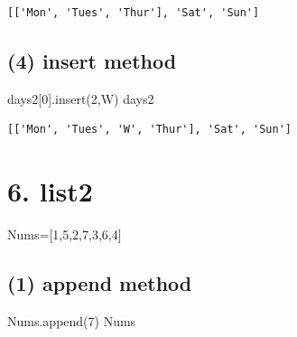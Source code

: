 \documentclass[
  a4paper,
  DIV=11,
  numbers=noendperiod]{scrreprt}
\newenvironment{Shaded}{\begin{snugshade}}{\end{snugshade}}
\newcommand{\DecValTok}[1]{\textcolor[rgb]{0.68,0.00,0.00}{#1}}
\newcommand{\NormalTok}[1]{\textcolor[rgb]{0.00,0.23,0.31}{#1}}
\newcommand{\OperatorTok}[1]{\textcolor[rgb]{0.37,0.37,0.37}{#1}}
\newcommand{\StringTok}[1]{\textcolor[rgb]{0.13,0.47,0.30}{#1}}
\begin{document}
\begin{verbatim}
[['Mon', 'Tues', 'Thur'], 'Sat', 'Sun']
\end{verbatim}

\subsection*{(4) insert method}\label{insert-method}

\begin{Shaded}
\begin{Highlighting}[]
\NormalTok{days2[}\DecValTok{0}\NormalTok{].insert(}\DecValTok{2}\NormalTok{,}\StringTok{\textquotesingle{}W\textquotesingle{}}\NormalTok{)}
\NormalTok{days2}
\end{Highlighting}
\end{Shaded}

\begin{verbatim}
[['Mon', 'Tues', 'W', 'Thur'], 'Sat', 'Sun']
\end{verbatim}

\section*{6. list2}\label{list2}


\begin{Shaded}
\begin{Highlighting}[]
\NormalTok{Nums}\OperatorTok{=}\NormalTok{[}\DecValTok{1}\NormalTok{,}\DecValTok{5}\NormalTok{,}\DecValTok{2}\NormalTok{,}\DecValTok{7}\NormalTok{,}\DecValTok{3}\NormalTok{,}\DecValTok{6}\NormalTok{,}\DecValTok{4}\NormalTok{]}
\end{Highlighting}
\end{Shaded}

\subsection*{(1) append method}\label{append-method}

\begin{Shaded}
\begin{Highlighting}[]
\NormalTok{Nums.append(}\DecValTok{7}\NormalTok{)}
\NormalTok{Nums}
\end{Highlighting}
\end{Shaded}
\end{document}
